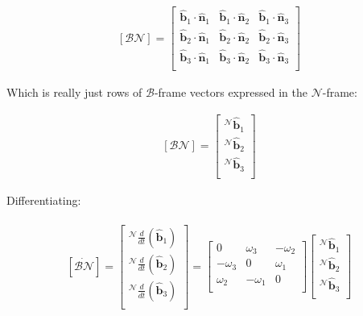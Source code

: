 \documentclass[
]{article}
\begin{document}
\[\begin{aligned}
\left[\mathcal{BN}\right] = \begin{bmatrix}
        \hat{\boldsymbol{b}}_1 \cdot \hat{\boldsymbol{n}}_1 & \hat{\boldsymbol{b}}_1 \cdot \hat{\boldsymbol{n}}_2 & \hat{\boldsymbol{b}}_1 \cdot \hat{\boldsymbol{n}}_3 \\
        \hat{\boldsymbol{b}}_2 \cdot \hat{\boldsymbol{n}}_1 & \hat{\boldsymbol{b}}_2 \cdot \hat{\boldsymbol{n}}_2 & \hat{\boldsymbol{b}}_2 \cdot \hat{\boldsymbol{n}}_3 \\
        \hat{\boldsymbol{b}}_3 \cdot \hat{\boldsymbol{n}}_1 & \hat{\boldsymbol{b}}_3 \cdot \hat{\boldsymbol{n}}_2 & \hat{\boldsymbol{b}}_3 \cdot \hat{\boldsymbol{n}}_3 \\
    \end{bmatrix}
\end{aligned}\]

Which is really just rows of \(\mathcal{B}\)-frame vectors expressed in
the \(\mathcal{N}\)-frame:

\[\begin{aligned}
\left[\mathcal{BN}\right] = \begin{bmatrix}
        {}^\mathcal{N}\hat{\boldsymbol{b}}_1 \\ {}^\mathcal{N}\hat{\boldsymbol{b}}_2 \\ {}^\mathcal{N}\hat{\boldsymbol{b}}_3 \\
    \end{bmatrix}
\end{aligned}\]

Differentiating:

\[\begin{aligned}
\begin{aligned}
    \left[\dot{\mathcal{BN}}\right] = \begin{bmatrix}
        {}^\mathcal{N}\frac{d}{dt}\left(\hat{\boldsymbol{b}}_1\right) \\ {}^\mathcal{N}\frac{d}{dt}\left(\hat{\boldsymbol{b}}_2\right) \\ {}^\mathcal{N}\frac{d}{dt}\left(\hat{\boldsymbol{b}}_3\right) \\
    \end{bmatrix} = \begin{bmatrix}
        0 & \omega_3 & -\omega_2 \\
        -\omega_3 & 0 & \omega_1 \\
        \omega_2 & -\omega_1 & 0 \\
    \end{bmatrix}
    \begin{bmatrix}
        {}^\mathcal{N}\hat{\boldsymbol{b}}_1 \\ {}^\mathcal{N}\hat{\boldsymbol{b}}_2 \\ {}^\mathcal{N}\hat{\boldsymbol{b}}_3 \\
    \end{bmatrix} \\
\end{aligned}
\end{aligned}\]
\end{document}
